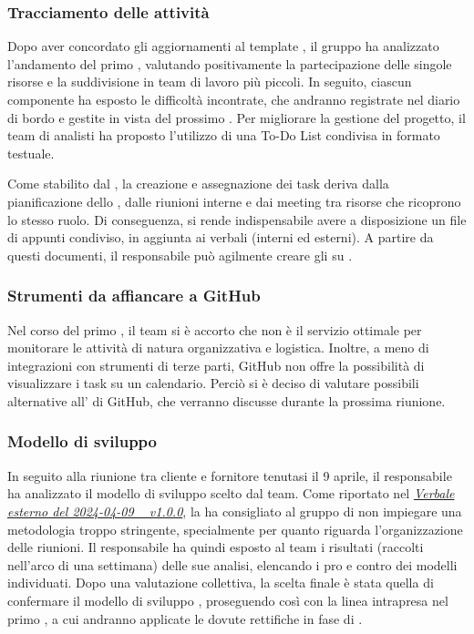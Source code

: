 \subsubsection{Tracciamento delle attività}
\par Dopo aver concordato gli aggiornamenti al template , il gruppo ha analizzato l'andamento del primo , valutando positivamente la partecipazione delle singole risorse e la suddivisione in team di lavoro più piccoli. In seguito, ciascun componente ha esposto le difficoltà incontrate, che andranno registrate nel diario di bordo e gestite in vista del prossimo . Per migliorare la gestione del progetto, il team di analisti ha proposto l’utilizzo di una To-Do List condivisa in formato testuale.
\par Come stabilito dal \glossario{\WoW}, la creazione e assegnazione dei task deriva dalla pianificazione dello , dalle riunioni interne e dai meeting tra risorse che ricoprono lo stesso ruolo. Di conseguenza, si rende indispensabile avere a disposizione un file di appunti condiviso, in aggiunta ai verbali (interni ed esterni). A partire da questi documenti, il responsabile può agilmente creare gli  su .

\subsubsection{Strumenti da affiancare a GitHub}
\par Nel corso del primo , il team si è accorto che  non è il servizio ottimale per monitorare le attività di natura organizzativa e logistica. Inoltre, a meno di integrazioni con strumenti di terze parti, GitHub non offre la possibilità di visualizzare i task su un calendario. Perciò si è deciso di valutare possibili alternative all' di GitHub, che verranno discusse durante la prossima riunione.

\subsubsection{Modello di sviluppo}
\par In seguito alla riunione tra cliente e fornitore tenutasi il 9 aprile, il responsabile ha analizzato il modello di sviluppo scelto dal team. Come riportato nel \href{https://argo-swe.github.io/2_RTB/Verbali/Esterni/VerbaleEsterno_2024-04-09.pdf}{\emph{Verbale esterno del 2024-04-09 \  v1.0.0}}, la  ha consigliato al gruppo di non impiegare una metodologia troppo stringente, specialmente per quanto riguarda l'organizzazione delle riunioni. Il responsabile ha quindi esposto al team i risultati (raccolti nell'arco di una settimana) delle sue analisi, elencando i pro e contro dei modelli individuati. Dopo una valutazione collettiva, la scelta finale è stata quella di confermare il modello di sviluppo , proseguendo così con la linea intrapresa nel primo , a cui andranno applicate le dovute rettifiche in fase di .


